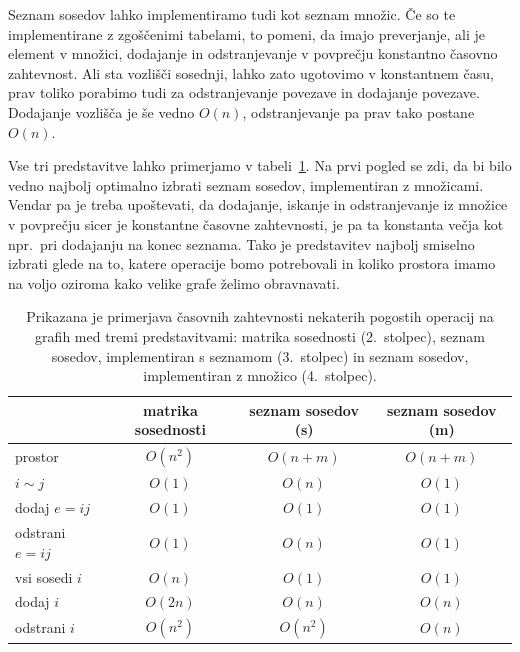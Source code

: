 \documentclass[12pt,a4paper,twoside]{article}
\theoremstyle{definition} %
\theoremstyle{plain} %
\numberwithin{equation}{section}  %
\begin{document}
Seznam sosedov lahko implementiramo tudi kot seznam množic. Če so te implementirane z zgoščenimi tabelami, to pomeni, da imajo preverjanje, ali je element v množici, dodajanje in odstranjevanje v povprečju konstantno časovno zahtevnost. Ali sta vozlišči sosednji, lahko zato ugotovimo v konstantnem času, prav toliko porabimo tudi za odstranjevanje povezave in dodajanje povezave. Dodajanje vozlišča je še vedno $O(n)$, odstranjevanje pa prav tako postane $O(n)$. 

Vse tri predstavitve lahko primerjamo v tabeli~\ref{tab:primerjava-predstavitev}.
Na prvi pogled se zdi, da bi bilo vedno najbolj optimalno izbrati seznam sosedov, implementiran z množicami. Vendar pa je treba upoštevati, da dodajanje, iskanje in odstranjevanje iz množice v povprečju sicer je konstantne časovne zahtevnosti, je pa ta konstanta večja kot npr.~pri dodajanju na konec seznama. Tako je predstavitev najbolj smiselno izbrati glede na to, katere operacije bomo potrebovali in koliko prostora imamo na voljo oziroma kako velike grafe želimo obravnavati. 

\begin{table}[h]
    \centering
    \begin{tabular}{lccc}
        \toprule
        & matrika sosednosti & seznam sosedov (s) & seznam sosedov (m) \\ \midrule
        prostor & $O(n^2)$ & $O(n + m)$ & $O(n + m)$ \\
        $i \sim j$ & $O(1)$ & $O(n)$ & $O(1)$ \\
        dodaj $e = ij$ & $O(1)$ & $O(1)$ & $O(1)$ \\
        odstrani $e = ij$ & $O(1)$ & $O(n)$ & $O(1)$ \\
        vsi sosedi $i$ & $O(n)$ & $O(1)$ & $O(1)$\\
        dodaj $i$ & $O(2n)$ & $O(n)$ & $O(n)$ \\
        odstrani $i$ & $O(n^2)$ & $O(n^2)$ & $O(n)$ \\
        \bottomrule
    \end{tabular}
    \caption{Prikazana je primerjava časovnih zahtevnosti nekaterih pogostih operacij na grafih med tremi predstavitvami: matrika sosednosti (2.~stolpec), seznam sosedov, implementiran s seznamom (3.~stolpec) in seznam sosedov, implementiran z množico (4.~stolpec).}
    \label{tab:primerjava-predstavitev}
\end{table}
\end{document}
